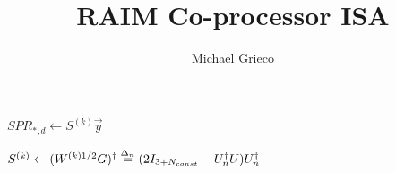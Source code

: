 \documentclass[11pt]{article}
\title{RAIM Co-processor ISA}
\author{Michael Grieco}
\date{}
\begin{document}
$SPR_{*,d} \leftarrow S^{(k)} \vec{y}$

$
S^{(k)} \leftarrow (W^{(k)1/2}G)^{\dagger}
\newline 
\stackrel{\Delta_n}{=} (2I_{3+N_{const}} - U^{\dagger}_n U) U^{\dagger}_n
$
\end{document}
